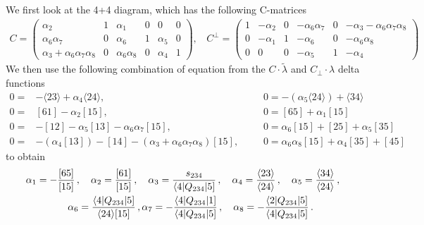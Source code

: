 \documentclass[letter,11pt]{article}
\newcommand{\ab}[1]{\langle #1 \rangle}
\newcommand{\sqb}[1]{[ #1 ]}
\newcommand{\aMs}[3]{\langle #1|#2|#3]}  		%
\newcommand{\sab}[1]{s_{#1}}
\newcommand{\twhite}[1]{\textcolor{white}{#1}}
\begin{document}
We first look at the 4+4 diagram, which has the following C-matrices
\begin{equation}
	\begin{aligned}
		C=\begin{pmatrix}
			\alpha_2 & 1 & \alpha_1 & 0 & 0 & 0\\
			\alpha_6 \alpha_7 & 0 &\alpha_6 & 1 & \alpha_5 & 0\\
			\alpha_3+\alpha_6\alpha_7\alpha_8 & 0 & \alpha_6\alpha_8  & 0 & \alpha_4 & 1
		\end{pmatrix},~~~~	C^\perp=\begin{pmatrix}
		1 & -\alpha_2 & 0 &-\alpha_6 \alpha_7 & 0 & -\alpha_3-\alpha_6\alpha_7\alpha_8\\
		0  & -\alpha_1 & 1 & -\alpha_6 & 0 & -\alpha_6\alpha_8\\
		0 & 0 & 0  & -\alpha_5 & 1 & -\alpha_4
	\end{pmatrix}
	\end{aligned}
\end{equation}
We then use the following combination of equation from the $C\cdot\tilde \lambda$ and $C_\perp\cdot \lambda$ delta functions
\begin{equation}
	\begin{aligned}
0=&-\langle 2 3 \rangle + \alpha_{4} \langle 2 4 \rangle,~~~~&&
0=-(\alpha_{5} \langle 2 4 \rangle) + \langle 3 4 \rangle
\\
0=&\left[ 6 1 \right] - \alpha_{2} \left[ 1 5 \right],~~~~&&
0=\left[ 6 5 \right] + \alpha_{1} \left[ 1 5 \right]
\\
0=&-\left[ 1 2 \right] - \alpha_{5} \left[ 1 3 \right] - \alpha_{6} \alpha_{7} \left[ 1 5 \right],~~~~&&
0=\alpha_{6} \left[ 1 5 \right] + \left[ 2 5 \right] + \alpha_{5} \left[ 3 5 \right]
\\
0=&-(\alpha_{4} \left[ 1 3 \right]) - \left[ 1 4 \right] - ( \alpha_{3} + \alpha_{6} \alpha_{7} \alpha_{8}) \left[ 1 5 \right],~~~~&&
0=\alpha_{6} \alpha_{8} \left[ 1 5 \right] + \alpha_{4} \left[ 3 5 \right] + \left[ 4 5 \right]
	\end{aligned}
\end{equation}
to obtain
\begin{align*}
	& \alpha_1 = -\frac{[65]}{[15]}\,, \quad \alpha_2 = \frac{[61]}{[15]}\,, \quad \alpha_3 = \frac{\sab{234}}{\aMs{4}{Q_{234}}{5}}\,, \quad \alpha_4 = \frac{\ab{23}}{\ab{24}}\,, \quad
	\alpha_5 = \frac{\ab{34}}{\ab{24}}\,, \\ 
	& \twhite{.}\hspace{1.4cm} 
	\alpha_6 = \frac{\aMs{4}{Q_{234}}{5}}{\ab{24}\sqb{15}}\,, \alpha_7 = -\frac{\aMs{4}{Q_{234}}{1}}{\aMs{4}{Q_{234}}{5}}\,,\quad
	\alpha_8 = - \frac{\aMs{2}{Q_{234}}{5}}{\aMs{4}{Q_{234}}{5}}\,.
\end{align*}
\end{document}
